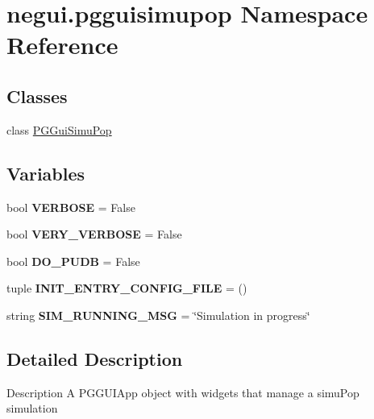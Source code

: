 \hypertarget{namespacenegui_1_1pgguisimupop}{}\section{negui.\+pgguisimupop Namespace Reference}
\label{namespacenegui_1_1pgguisimupop}
\subsection*{Classes}
\begin{DoxyCompactItemize}
\item 
class \hyperlink{classnegui_1_1pgguisimupop_1_1PGGuiSimuPop}{P\+G\+Gui\+Simu\+Pop}
\end{DoxyCompactItemize}
\subsection*{Variables}
\begin{DoxyCompactItemize}
\item 
bool {\bfseries V\+E\+R\+B\+O\+SE} = False\hypertarget{namespacenegui_1_1pgguisimupop_aab29eb6c6feb0d32b5d60b4eef930da9}{}\label{namespacenegui_1_1pgguisimupop_aab29eb6c6feb0d32b5d60b4eef930da9}

\item 
bool {\bfseries V\+E\+R\+Y\+\_\+\+V\+E\+R\+B\+O\+SE} = False\hypertarget{namespacenegui_1_1pgguisimupop_af283504b4edcb1ce9f987a021991a900}{}\label{namespacenegui_1_1pgguisimupop_af283504b4edcb1ce9f987a021991a900}

\item 
bool {\bfseries D\+O\+\_\+\+P\+U\+DB} = False\hypertarget{namespacenegui_1_1pgguisimupop_a7828b4058072779ad8f76eaa79a87952}{}\label{namespacenegui_1_1pgguisimupop_a7828b4058072779ad8f76eaa79a87952}

\item 
tuple {\bfseries I\+N\+I\+T\+\_\+\+E\+N\+T\+R\+Y\+\_\+\+C\+O\+N\+F\+I\+G\+\_\+\+F\+I\+LE} = ()\hypertarget{namespacenegui_1_1pgguisimupop_a0c62f73e78dad26e648483936e298140}{}\label{namespacenegui_1_1pgguisimupop_a0c62f73e78dad26e648483936e298140}

\item 
string {\bfseries S\+I\+M\+\_\+\+R\+U\+N\+N\+I\+N\+G\+\_\+\+M\+SG} = \char`\"{}Simulation in progress\char`\"{}\hypertarget{namespacenegui_1_1pgguisimupop_a8a725ff5a5dd2af5a91501e7c7ab5cc7}{}\label{namespacenegui_1_1pgguisimupop_a8a725ff5a5dd2af5a91501e7c7ab5cc7}

\end{DoxyCompactItemize}


\subsection{Detailed Description}
\begin{DoxyVerb}Description
A PGGUIApp object with widgets that manage a simuPop simulation
\end{DoxyVerb}
 